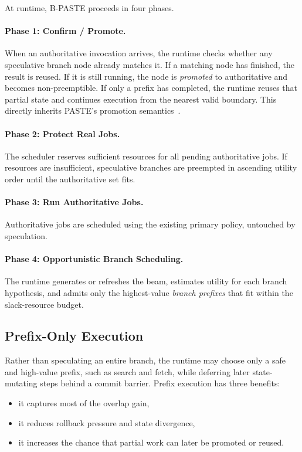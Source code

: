 \documentclass[10pt,twocolumn]{article}
\begin{document}
At runtime, B-PASTE proceeds in four phases.

\paragraph{Phase 1: Confirm / Promote.}
When an authoritative invocation arrives, the runtime checks whether any speculative branch node already matches it. If a matching node has finished, the result is reused. If it is still running, the node is \emph{promoted} to authoritative and becomes non-preemptible. If only a prefix has completed, the runtime reuses that partial state and continues execution from the nearest valid boundary. This directly inherits PASTE's promotion semantics~\cite{paste}.

\paragraph{Phase 2: Protect Real Jobs.}
The scheduler reserves sufficient resources for all pending authoritative jobs. If resources are insufficient, speculative branches are preempted in ascending utility order until the authoritative set fits.

\paragraph{Phase 3: Run Authoritative Jobs.}
Authoritative jobs are scheduled using the existing primary policy, untouched by speculation.

\paragraph{Phase 4: Opportunistic Branch Scheduling.}
The runtime generates or refreshes the beam, estimates utility for each branch hypothesis, and admits only the highest-value \emph{branch prefixes} that fit within the slack-resource budget.

\subsection{Prefix-Only Execution}

Rather than speculating an entire branch, the runtime may choose only a safe and high-value prefix, such as search and fetch, while deferring later state-mutating steps behind a commit barrier. Prefix execution has three benefits:
\begin{itemize}[leftmargin=1.5em]
    \item it captures most of the overlap gain,
    \item it reduces rollback pressure and state divergence,
    \item it increases the chance that partial work can later be promoted or reused.
\end{itemize}
\end{document}
